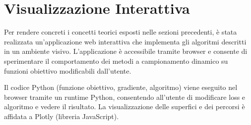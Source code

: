 \documentclass[a4paper,12pt]{article}
\begin{document}
\section{Visualizzazione Interattiva}

Per rendere concreti i concetti teorici esposti nelle sezioni precedenti, è stata realizzata un'applicazione web interattiva che implementa gli algoritmi descritti in un ambiente visivo. L'applicazione è accessibile tramite browser e consente di sperimentare il comportamento dei metodi a campionamento dinamico su funzioni obiettivo modificabili dall'utente.

Il codice Python (funzione obiettivo, gradiente, algoritmo) viene eseguito nel browser tramite un runtime Python, consentendo all'utente di modificare loss e algoritmo e vedere il risultato. La visualizzazione delle superfici e dei percorsi è affidata a Plotly (libreria JavaScript).
\end{document}

